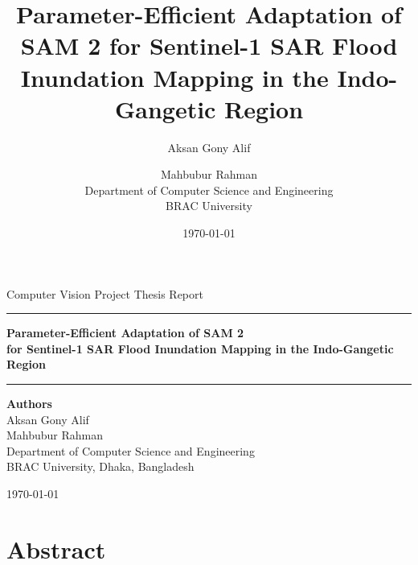 \documentclass[11pt,a4paper,oneside]{report}
\title{Parameter-Efficient Adaptation of SAM 2 for Sentinel-1 SAR Flood Inundation Mapping in the Indo-Gangetic Region}
\author{Aksan Gony Alif \and Mahbubur Rahman \\ Department of Computer Science and Engineering \\ BRAC University}
\date{\today}
\begin{document}
\begin{titlepage}
\centering
\vspace*{1.5cm}
{\large Computer Vision Project Thesis Report \par}
\vspace{0.5cm}
\rule{\linewidth}{0.5pt}
\vspace{0.8cm}

{\Large\bfseries Parameter-Efficient Adaptation of SAM 2 \\[0.3em] for Sentinel-1 SAR Flood Inundation Mapping in the Indo-Gangetic Region \par}

\vspace{0.5cm}
\rule{\linewidth}{0.5pt}

\vfill

{\large
\textbf{Authors} \\
Aksan Gony Alif \\[0.2em]
Mahbubur Rahman \\[0.3em]
Department of Computer Science and Engineering \\
BRAC University, Dhaka, Bangladesh \\
}

\vspace{2cm}

{\large \today}

\end{titlepage}

\chapter*{Abstract}
\end{document}
